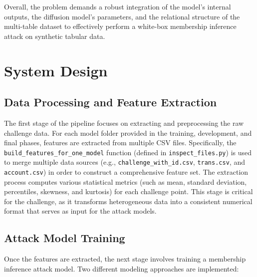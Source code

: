 \documentclass[12pt]{article}
\begin{document}
Overall, the problem demands a robust integration of the model’s internal outputs, the diffusion model’s parameters, and the relational structure of the multi-table dataset to effectively perform a white-box membership inference attack on synthetic tabular data.

\section{System Design}
\label{sec:system-design}
\subsection{Data Processing and Feature Extraction}
The first stage of the pipeline focuses on extracting and preprocessing the raw challenge data. For each model folder provided in the training, development, and final phases, features are extracted from multiple CSV files. Specifically, the \texttt{build\_features\_for\_one\_model} function (defined in \texttt{inspect\_files.py}) is used to merge multiple data sources (e.g., \texttt{challenge\_with\_id.csv}, \texttt{trans.csv}, and \texttt{account.csv}) in order to construct a comprehensive feature set. The extraction process computes various statistical metrics (such as mean, standard deviation, percentiles, skewness, and kurtosis) for each challenge point. This stage is critical for the challenge, as it transforms heterogeneous data into a consistent numerical format that serves as input for the attack models.

\subsection{Attack Model Training}
Once the features are extracted, the next stage involves training a membership inference attack model. Two different modeling approaches are implemented:
\end{document}

